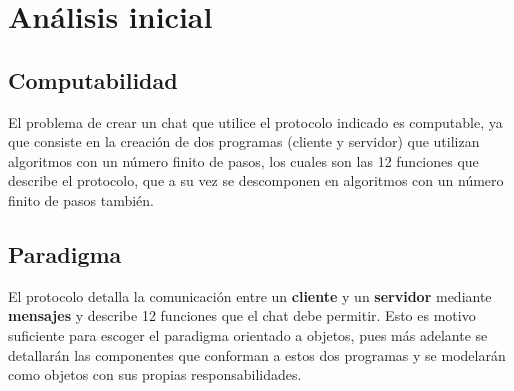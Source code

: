 
\chapter{Análisis inicial}

\section{Computabilidad}

El problema de crear un chat que utilice el protocolo indicado es computable, ya que consiste en la creación de dos programas (cliente y servidor) que utilizan algoritmos con un número finito de pasos, los cuales son las 12 funciones que describe el protocolo, que a su vez se descomponen en algoritmos con un número finito de pasos también.

\section{Paradigma}

El protocolo detalla la comunicación entre un \textbf{cliente} y un \textbf{servidor} mediante \textbf{mensajes} y describe 12 funciones que el chat debe permitir. Esto es motivo suficiente para escoger el paradigma orientado a objetos, pues más adelante se detallarán las componentes que conforman a estos dos programas y se modelarán como objetos con sus propias responsabilidades.